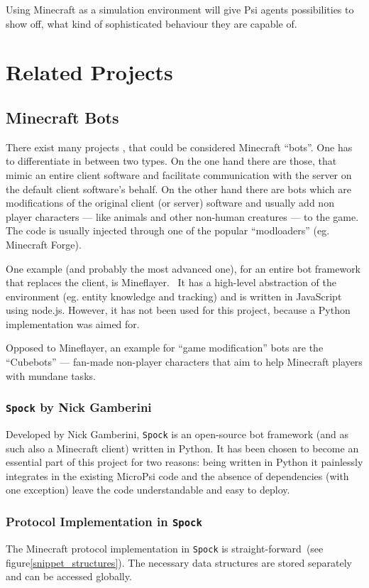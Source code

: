 Using Minecraft as a simulation environment will give Psi agents possibilities to show off, what kind of sophisticated behaviour they are capable of.

\section{Related Projects}
    \subsection{Minecraft Bots}
There exist many projects , that could be considered Minecraft ``bots''. One has to differentiate in between two types. On the one hand there are those, that mimic an entire client software and facilitate communication with the server on the default client software's behalf. On the other hand there are bots which are modifications of the original client (or server) software and usually add non player characters --- like animals and other non-human creatures --- to the game. The code is usually injected through one of the popular ``modloaders'' (eg. Minecraft Forge).

One example (and probably the most advanced one), for an entire bot framework that replaces the client, is Mineflayer.~\cite{github_mineflayer} It has a high-level abstraction of the environment (eg. entity knowledge and tracking) and is written in JavaScript using node.js. However, it has not been used for this project, because a Python implementation was aimed for.

Opposed to Mineflayer, an example for ``game modification'' bots are the ``Cubebots'' --- fan-made non-player characters that aim to help Minecraft players with mundane tasks.\cite{mcforums_cubebot}

    \subsubsection{\texttt{Spock} by Nick Gamberini}
Developed by Nick Gamberini, \texttt{Spock} is an open-source bot framework (and as such also a Minecraft client) written in Python. It has been chosen to become an essential part of this project for two reasons: being written in Python it painlessly integrates in the existing MicroPsi code and the absence of dependencies (with one exception) leave the code understandable and easy to deploy.
    
    \subsubsection{Protocol Implementation in \texttt{Spock}}
The Minecraft protocol implementation in \texttt{Spock} is straight-forward~(see figure\ref{snippet_structures}). The necessary data structures are stored separately and can be accessed globally.

